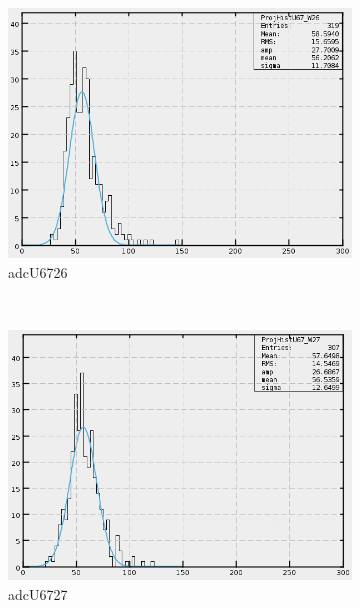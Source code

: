 \begin{figure}[h]
    \centering
    \begin{subfigure}[h]{0.3\textwidth}
        \centering
        \includegraphics[width=\textwidth, keepaspectratio = true]{adcU67_26}
        \caption{adcU6726}
        \label{fig:adcU67_26}
    \end{subfigure}
    ~
    \begin{subfigure}[h]{0.3\textwidth}
        \centering
        \includegraphics[width=\textwidth, keepaspectratio = true]{adcU67_27}
        \caption{adcU6727}
        \label{fig:adcU67_27}
    \end{subfigure}
    ~
    \begin{subfigure}[h]{0.3\textwidth}
        \centering

\end{subfigure}
\end{figure}
